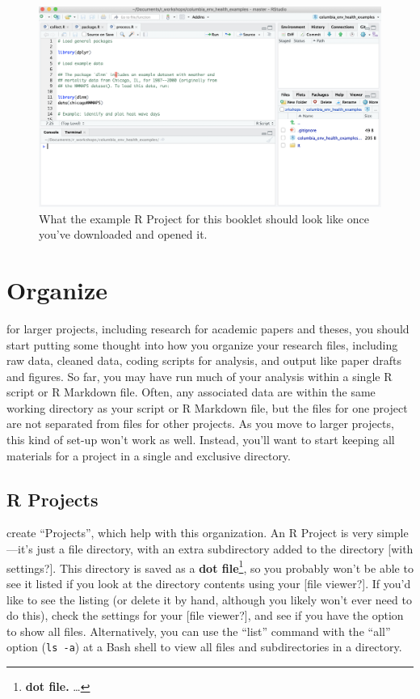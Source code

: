 \documentclass[]{tufte-book}
\begin{document}
\begin{figure}
\includegraphics[width=28.86in]{images/example_repo} \caption[What the example R Project for this booklet should look like once you've downloaded and opened it]{What the example R Project for this booklet should look like once you've downloaded and opened it.}\label{fig:examplerepo}
\end{figure}

\hypertarget{organize}{%
\chapter{Organize}\label{organize}}

 for larger projects, including
research for academic papers and theses, you should start putting some thought
into how you organize your research files, including raw data, cleaned data,
coding scripts for analysis, and output like paper drafts and figures. So far,
you may have run much of your analysis within a single R script or R Markdown
file. Often, any associated data are within the same working directory as your
script or R Markdown file, but the files for one project are not separated from
files for other projects. As you move to larger projects, this kind of set-up
won't work as well. Instead, you'll want to start keeping all materials for a
project in a single and exclusive directory.

\hypertarget{r-projects}{%
\section{R Projects}\label{r-projects}}

 create ``Projects'', which help with this
organization. An R Project is very simple---it's just a file directory, with an
extra subdirectory added to the directory {[}with settings?{]}. This directory is
saved as a \textbf{dot file}\footnote{\textbf{dot file.} \ldots{}}, so you probably won't be able to see it
listed if you look at the directory contents using your {[}file viewer?{]}. If you'd like
to see the listing (or delete it by hand, although you likely won't ever need to
do this), check the settings for your {[}file viewer?{]}, and see if you have the option
to show all files. Alternatively, you can use the ``list'' command with the ``all'' option
(\texttt{ls\ -a}) at a Bash shell to view all files and subdirectories in a directory.
\end{document}
